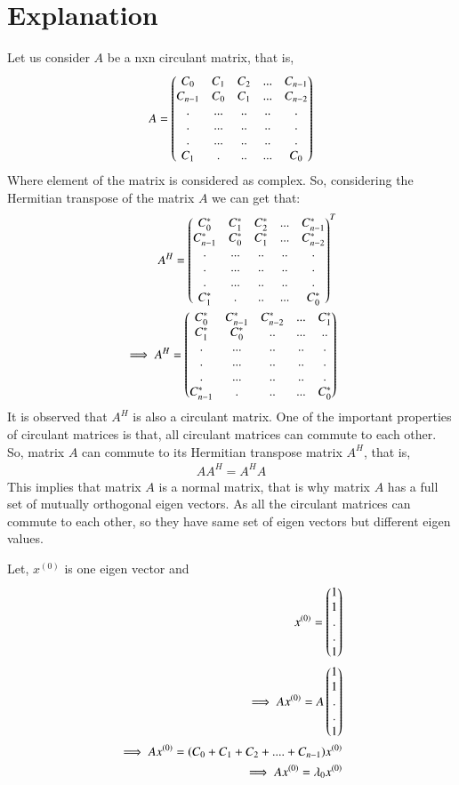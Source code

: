 \documentclass[journal,12pt,twocolumn]{IEEEtran}
\begin{document}
\section{Explanation}
Let us consider $A$ be a nxn circulant matrix, that is,
\begin{align}
A = \begin{pmatrix}C_0 & C_1 & C_2 & ...& C_{n-1}\\C_{n-1} & C_0 & C_1 & ...& C_{n-2}\\.& ...&..&..&.\\.& ...&..&..&.\\.& ...&..&..&.\\C_1 & .&..&...& C_0\end{pmatrix}
\end{align}
Where element of the matrix is considered as complex. So, considering the Hermitian transpose of the matrix $A$ we can get that:
\begin{align}
A^H = \begin{pmatrix}C_0^* & C_1^* & C_2^* & ...& C_{n-1}^*\\C_{n-1}^* & C_0^* & C_1^* & ...& C_{n-2}^*\\.& ...&..&..&.\\.& ...&..&..&.\\.& ...&..&..&.\\C_1^* & .&..&...& C_0^*\end{pmatrix}^T\\
\implies A^H = \begin{pmatrix}C_0^* & C_{n-1}^* & C_{n-2}^* & ...& C_1^*\\C_1^* & C_0^* & .. & ...& ..\\.& ...&..&..&.\\.& ...&..&..&.\\.& ...&..&..&.\\C_{n-1}^* & .&..&...& C_0^*\end{pmatrix}
\end{align}
It is observed that $A^H$ is also a circulant matrix.
One of the important properties of circulant matrices is that, all circulant matrices can commute to each other. So, matrix $A$ can commute to its Hermitian transpose matrix $A^H$, that is, 
\begin{align}
A A^H = A^H A
\end{align}
This implies that matrix $A$ is a normal matrix, that is why matrix $A$ has a full set of mutually orthogonal eigen vectors.
As all the circulant matrices can commute to each other, so they have same set of eigen vectors but different eigen values.

Let, $x^{(0)}$ is one eigen vector and
\begin{align}
x^{(0)} = \begin{pmatrix}1\\1\\.\\.\\1\end{pmatrix}\\
\implies Ax^{(0)} = A \begin{pmatrix}1\\1\\.\\.\\1\end{pmatrix}\\
\implies Ax^{(0)} = (C_0+C_1+C_2+....+C_{n-1})x^{(0)}\\
\implies Ax^{(0)} = \lambda_0 x^{(0)}
\end{align}
\end{document}
